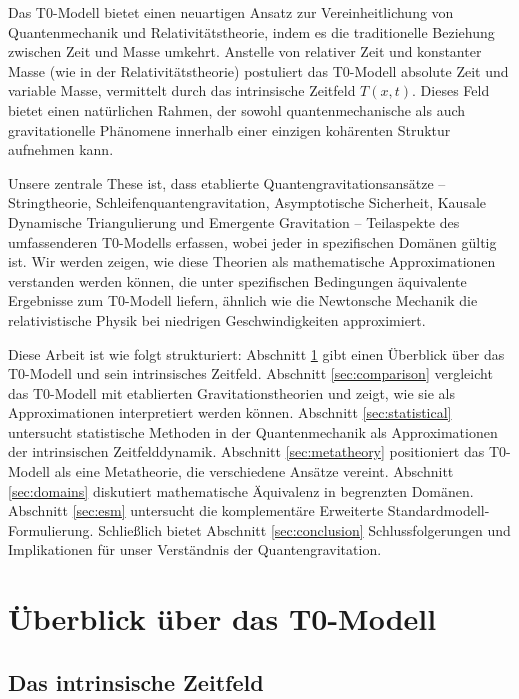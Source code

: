 \documentclass[12pt,a4paper]{article}
\newcommand{\Tfieldt}{T(x,t)}
\begin{document}
	Das T0-Modell \cite{pascher_part1_2025,pascher_part2_2025} bietet einen neuartigen Ansatz zur Vereinheitlichung von Quantenmechanik und Relativitätstheorie, indem es die traditionelle Beziehung zwischen Zeit und Masse umkehrt. Anstelle von relativer Zeit und konstanter Masse (wie in der Relativitätstheorie) postuliert das T0-Modell absolute Zeit und variable Masse, vermittelt durch das intrinsische Zeitfeld $\Tfieldt$. Dieses Feld bietet einen natürlichen Rahmen, der sowohl quantenmechanische als auch gravitationelle Phänomene innerhalb einer einzigen kohärenten Struktur aufnehmen kann.
	
	Unsere zentrale These ist, dass etablierte Quantengravitationsansätze – Stringtheorie, Schleifenquantengravitation, Asymptotische Sicherheit, Kausale Dynamische Triangulierung und Emergente Gravitation – Teilaspekte des umfassenderen T0-Modells erfassen, wobei jeder in spezifischen Domänen gültig ist. Wir werden zeigen, wie diese Theorien als mathematische Approximationen verstanden werden können, die unter spezifischen Bedingungen äquivalente Ergebnisse zum T0-Modell liefern, ähnlich wie die Newtonsche Mechanik die relativistische Physik bei niedrigen Geschwindigkeiten approximiert.
	
	Diese Arbeit ist wie folgt strukturiert: Abschnitt \ref{sec:t0_overview} gibt einen Überblick über das T0-Modell und sein intrinsisches Zeitfeld. Abschnitt \ref{sec:comparison} vergleicht das T0-Modell mit etablierten Gravitationstheorien und zeigt, wie sie als Approximationen interpretiert werden können. Abschnitt \ref{sec:statistical} untersucht statistische Methoden in der Quantenmechanik als Approximationen der intrinsischen Zeitfelddynamik. Abschnitt \ref{sec:metatheory} positioniert das T0-Modell als eine Metatheorie, die verschiedene Ansätze vereint. Abschnitt \ref{sec:domains} diskutiert mathematische Äquivalenz in begrenzten Domänen. Abschnitt \ref{sec:esm} untersucht die komplementäre Erweiterte Standardmodell-Formulierung. Schließlich bietet Abschnitt \ref{sec:conclusion} Schlussfolgerungen und Implikationen für unser Verständnis der Quantengravitation.
	
	\section{Überblick über das T0-Modell}
	\label{sec:t0_overview}
	
	\subsection{Das intrinsische Zeitfeld}
	\label{subsec:time_field}
	
\end{document}
